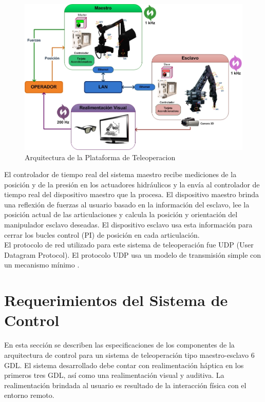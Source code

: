 \begin{figure}[hbt!]
\caption{Arquitectura de la Plataforma de Teleoperacion}
\label{fig:arquitectura}
\includegraphics[scale=0.7]{FiguresP/ManufacturerArquitecture}
\end{figure}




El controlador de tiempo real del sistema maestro recibe mediciones de la posición y de la presión en los actuadores hidráulicos y la envía al controlador de tiempo real del dispositivo maestro que la procesa. El dispositivo maestro brinda una reflexión  de fuerzas al usuario basado en la información del esclavo, lee la posición actual de las articulaciones y calcula la posición y orientación del manipulador esclavo deseadas. El  dispositivo esclavo  usa esta información para  cerrar los bucles control (PI) de posición en cada articulación.\\

El protocolo de red utilizado para este sistema de teleoperación fue UDP (User Datagram Protocol). El protocolo UDP usa  un modelo de transmisión simple con un mecanismo mínimo\cite{zhao2006contrast} .



\section{Requerimientos del Sistema de Control}

En esta sección se describen las especificaciones de los componentes de la arquitectura de control para un sistema de teleoperación tipo maestro-esclavo 6 GDL. El sistema desarrollado debe contar con realimentación háptica  en los primeros tres  GDL, así como una realimentación visual y auditiva. La realimentación brindada al usuario es resultado de la interacción física con el entorno remoto.\\

